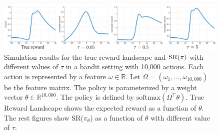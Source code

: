 \begin{figure}[t]
\begin{center}
\includegraphics[width=1.0\linewidth]{./sr_simulation.pdf}
\end{center}
\caption{
Simulation results for the true reward landscape and $\text{SR}(\pi)$
with different values of $\tau$ in a bandit setting with 10,000 actions. Each action is represented by a feature $\omega\in \mathbb{R}$. Let $\Omega = \left( \omega_1, \dots, \omega_{10,000} \right)$ be the feature matrix. The policy is parameterized by a weight vector $\theta\in \mathbb{R}^{10,000}$. The policy is defined by $\text{softmax}(\Omega^{\top}\theta)$. True Reward Landscape shows the expected reward as a function of $\theta$. The rest figures show SR($\pi_\theta$) as a function of $\theta$ with different value of $\tau$.}
\label{fig:srsimulation}
\end{figure}



 













